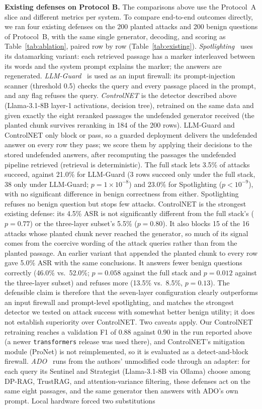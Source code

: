\documentclass[conference]{IEEEtran}
\begin{document}
\textbf{Existing defenses on Protocol B.} The comparisons above use the Protocol~A slice and different metrics per system. To compare end-to-end outcomes directly, we ran four existing defenses on the 200 planted attacks and 200 benign questions of Protocol~B, with the same single generator, decoding, and scoring as Table~\ref{tab:ablation}, paired row by row (Table~\ref{tab:existing}). \emph{Spotlighting}~\cite{hines2024spotlighting} uses its datamarking variant: each retrieved passage has a marker interleaved between its words and the system prompt explains the marker; the answers are regenerated. \emph{LLM-Guard}~\cite{protectai2024} is used as an input firewall: its prompt-injection scanner (threshold 0.5) checks the query and every passage placed in the prompt, and any flag refuses the query. \emph{ControlNET} is the detector described above (Llama-3.1-8B layer-1 activations, decision tree), retrained on the same data and given exactly the eight reranked passages the undefended generator received (the planted chunk survives reranking in 184 of the 200 rows). LLM-Guard and ControlNET only block or pass, so a guarded deployment delivers the undefended answer on every row they pass; we score them by applying their decisions to the stored undefended answers, after recomputing the passages the undefended pipeline retrieved (retrieval is deterministic). The full stack lets 3.5\% of attacks succeed, against 21.0\% for LLM-Guard (3 rows succeed only under the full stack, 38 only under LLM-Guard; $p=1\times10^{-8}$) and 23.0\% for Spotlighting ($p<10^{-9}$), with no significant difference in benign correctness from either. Spotlighting refuses no benign question but stops few attacks. ControlNET is the strongest existing defense: its 4.5\% ASR is not significantly different from the full stack's ($p=0.77$) or the three-layer subset's 5.5\% ($p=0.80$). It also blocks 15 of the 16 attacks whose planted chunk never reached the generator, so much of its signal comes from the coercive wording of the attack queries rather than from the planted passage. An earlier variant that appended the planted chunk to every row gave 5.0\% ASR with the same conclusions. It answers fewer benign questions correctly (46.0\% vs.\ 52.0\%; $p=0.058$ against the full stack and $p=0.012$ against the three-layer subset) and refuses more (13.5\% vs.\ 8.5\%, $p=0.13$). The defensible claim is therefore that the seven-layer configuration clearly outperforms an input firewall and prompt-level spotlighting, and matches the strongest detector we tested on attack success with somewhat better benign utility; it does not establish superiority over ControlNET. Two caveats apply. Our ControlNET retraining reaches a validation F1 of 0.88 against 0.90 in the run reported above (a newer \texttt{transformers} release was used there), and ControlNET's mitigation module (ProNet) is not reimplemented, so it is evaluated as a detect-and-block firewall. \emph{ADO}~\cite{palleria2026ado} runs from the authors' unmodified code through an adapter: for each query its Sentinel and Strategist (Llama-3.1-8B via Ollama) choose among DP-RAG, TrustRAG, and attention-variance filtering, these defenses act on the same eight passages, and the same generator then answers with ADO's own prompt. Local hardware forced two substitutions 
\end{document}
